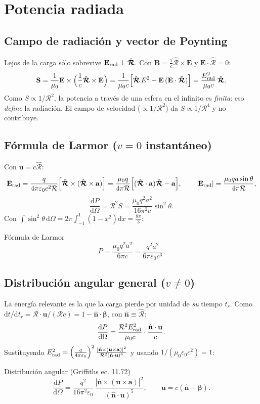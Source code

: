 \documentclass[11pt,a4paper]{article}
\newcommand{\Rv}{\bm{\mathcal R}}
\newcommand{\Rs}{\mathcal R}
\newcommand{\Rh}{\hat{\bm{\mathcal R}}}
\newcommand{\nh}{\hat{\mathbf n}}
\newcommand{\av}{\mathbf a}
\newcommand{\uv}{\mathbf u}
\newcommand{\dd}{\mathrm d}
\newcommand{\bbeta}{\bm\beta}
\theoremstyle{remark}
\begin{document}
\section{Potencia radiada}

\subsection{Campo de radiación y vector de Poynting}

Lejos de la carga sólo sobrevive $\mathbf E_{\rm rad}\perp\Rh$. Con
$\mathbf B=\frac1c\Rh\times\mathbf E$ y $\mathbf E\cdot\Rh=0$:
\[
\mathbf S=\frac1{\mu_0}\mathbf E\times\Big(\frac1c\Rh\times\mathbf E\Big)
=\frac1{\mu_0c}\Big[\Rh\,E^2-\mathbf E\,(\mathbf E\cdot\Rh)\Big]
=\frac{E_{\rm rad}^2}{\mu_0c}\,\Rh.
\]
Como $S\propto1/\Rs^2$, la potencia a través de una esfera en el infinito es \emph{finita}: eso
\emph{define} la radiación. El campo de velocidad ($\propto1/\Rs^2$) da $S\propto1/\Rs^4$ y no contribuye.

\subsection{Fórmula de Larmor ($v=0$ instantáneo)}

Con $\uv=c\Rh$:
\[
\mathbf E_{\rm rad}=\frac{q}{4\pi\varepsilon_0c^2\Rs}\Big[\Rh\times(\Rh\times\av)\Big]
=\frac{\mu_0q}{4\pi\Rs}\Big[(\Rh\cdot\av)\Rh-\av\Big],\qquad
|\mathbf E_{\rm rad}|=\frac{\mu_0qa\sin\theta}{4\pi\Rs},
\]
\[
\frac{\dd P}{\dd\Omega}=\Rs^2S=\frac{\mu_0q^2a^2}{16\pi^2c}\sin^2\theta.
\]
Con $\int\sin^2\theta\,\dd\Omega=2\pi\int_{-1}^1(1-x^2)\dd x=\frac{8\pi}{3}$:
\begin{resbox}{Fórmula de Larmor}
\begin{equation}
P=\frac{\mu_0q^2a^2}{6\pi c}=\frac{q^2a^2}{6\pi\varepsilon_0c^3}.
\label{eq:larmor}
\end{equation}
\end{resbox}

\subsection{Distribución angular general ($v\neq0$)}

La energía relevante es la que la carga pierde por unidad de \emph{su} tiempo $t_r$. Como
$\dd t/\dd t_r=\Rv\cdot\uv/(\Rs c)=1-\nh\cdot\bbeta$, con $\nh\equiv\Rh$:
\[
\frac{\dd P}{\dd\Omega}=\frac{\Rs^2E_{\rm rad}^2}{\mu_0c}\cdot\frac{\nh\cdot\uv}{c}.
\]
Sustituyendo $E_{\rm rad}^2=\left(\frac{q}{4\pi\varepsilon_0}\right)^2\frac{|\nh\times(\uv\times\av)|^2}{\Rs^2(\nh\cdot\uv)^6}$
y usando $1/(\mu_0\varepsilon_0c^2)=1$:
\begin{resbox}{Distribución angular (Griffiths ec. 11.72)}
\begin{equation}
\frac{\dd P}{\dd\Omega}=\frac{q^2}{16\pi^2\varepsilon_0}\,\frac{|\nh\times(\uv\times\av)|^2}{(\nh\cdot\uv)^5},
\qquad \uv=c(\nh-\bbeta).
\label{eq:dPdOmega}
\end{equation}
\end{resbox}
\end{document}
